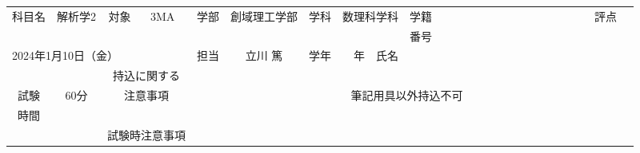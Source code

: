 \documentclass{jsarticle}
\begin{document}
\begin{tabular}{p{1cm}p{2cm}p{0.5cm}p{1.5cm}p{1cm}p{1.5cm}p{0.5cm}p{1cm}p{1cm}p{0.5cm}p{2cm}p{0.1cm}p{1cm}p{1cm}}
        \cline{1-11} \cline{13-14}
\multicolumn{1}{|c|}{\multirow{2}{*}{科目名}} &  \multicolumn{1}{c|}{\multirow{2}{*}{ 解析学2 }} & \multicolumn{1}{c|}{\multirow{2}{*}{対象}} & \multicolumn{1}{c|}{\multirow{2}{*}{ \ 3MA \ }} & \multicolumn{1}{c|}{\multirow{2}{*}{学部}} & \multicolumn{1}{c|}{\multirow{2}{*}{創域理工学部}} & \multicolumn{1}{c|}{\multirow{2}{*}{学科}} & \multicolumn{2}{c|}{\multirow{2}{*}{数理科学科}} & \multicolumn{1}{c|}{学籍} & \multicolumn{1}{c|}{ \ \ \ \ \ \ \ \ \ \ \ \ \ \ \ \ \ \ \ \ \ } & \multicolumn{1}{c|}{} & \multicolumn{1}{c}{ \ \ 評点} & \multicolumn{1}{c|}{}  \\ \cline{13-14}
\multicolumn{1}{|c|}{}  & \multicolumn{1}{c|}{} & \multicolumn{1}{c|}{}  & \multicolumn{1}{c|}{}  & \multicolumn{1}{c|}{} & \multicolumn{1}{c|}{}  & \multicolumn{1}{c|}{}  & \multicolumn{2}{c|}{}  & \multicolumn{1}{c|}{番号}  & \multicolumn{1}{c|}{} & \multicolumn{1}{c|}{} & \multicolumn{1}{c}{} & \multicolumn{1}{c|}{} \\ \cline{1-11}
\multicolumn{4}{|l|}{\multirow{2}{*}{2024年1月10日（金）}} & \multicolumn{1}{c|}{\multirow{2}{*}{担当}} & \multicolumn{1}{c|}{\multirow{2}{*}{立川 篤}} & \multicolumn{1}{c|}{\multirow{2}{*}{学年}} & \multicolumn{1}{c|}{\multirow{2}{*}{ \ \ 年}} & \multicolumn{1}{c|}{\multirow{2}{*}{氏名}} & \multicolumn{2}{c|}{} & \multicolumn{1}{c|}{} & \multicolumn{1}{c}{} & \multicolumn{1}{c|}{} \\ \cline{13-14} 
\multicolumn{4}{|r|}{3回目} & \multicolumn{1}{c|}{} & \multicolumn{1}{c|}{} & \multicolumn{1}{c|}{} & \multicolumn{1}{c|}{} & \multicolumn{1}{c|}{} & \multicolumn{2}{c|}{} \\ \cline{1-13}
\multicolumn{1}{|c|}{} & \multicolumn{1}{c|}{} & \multicolumn{2}{c|}{\multirow{1.8}{*}{持込に関する}} & \multicolumn{9}{c|}{} \\ 
\multicolumn{1}{|c|}{試験} & \multicolumn{1}{c|}{\multirow{2}{*}{{\LARGE60}分}} & \multicolumn{2}{c|}{\multirow{2.5}{*}{注意事項}} & \multicolumn{9}{c|}{筆記用具以外持込不可} \\ 
\multicolumn{1}{|c|}{時間} & \multicolumn{1}{c|}{} & \multicolumn{2}{c|}{} & \multicolumn{9}{c|}{} \\ \cline{3-13}
\multicolumn{1}{|c|}{} & \multicolumn{1}{c|}{} & \multicolumn{2}{c|}{試験時注意事項} & \multicolumn{9}{c|}{} \\
\cline{1-13}
\end{tabular}
\end{document}
